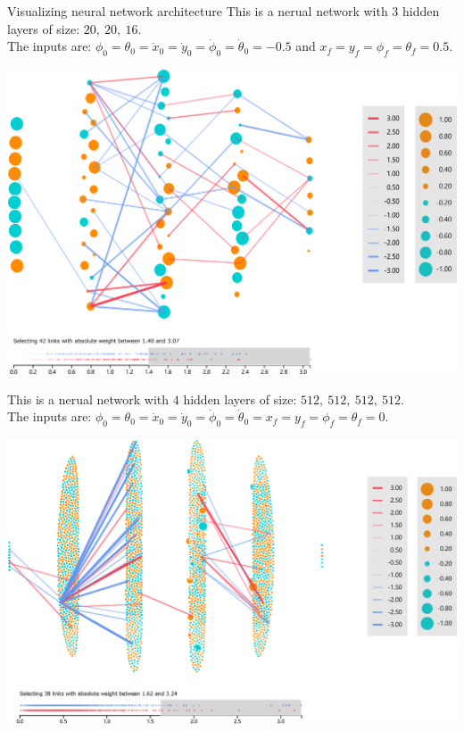 \documentclass[final,hyperref={pdfpagelabels=false}]{beamer}
\begin{document}
\begin{frame}{}
\begin{columns}[t]
      \begin{column}{.4\linewidth}
      \begin{block}{Visualizing neural network architecture}
      \noindent This is a nerual network with $3$ hidden layers of size: $20,\ 20,\ 16$.\\
      \noindent The inputs are: $\phi_0=\theta_0=\dot{x}_0=\dot{y}_0=\dot{\phi}_0=\dot{\theta}_0=-0.5$ and  $x_f=y_f=\phi_f=\theta_f=0.5$.
      \vspace{3cm}
      \begin{center}
                \includegraphics[scale=0.5]{chart1.eps}
      \end{center}
      \vspace{4cm}
        \noindent This is a nerual network with $4$ hidden layers of size: $512,\ 512,\ 512,\ 512$.\\
      \noindent The inputs are: $\phi_0=\theta_0=\dot{x}_0=\dot{y}_0=\dot{\phi}_0=\dot{\theta}_0=x_f=y_f=\phi_f=\theta_f=0$.
       \vspace{3cm}
       \begin{center}
                \includegraphics[scale=1.5]{chart3.eps}

\end{center}
\end{block}
\end{column}
\end{columns}
\end{frame}
\end{document}

